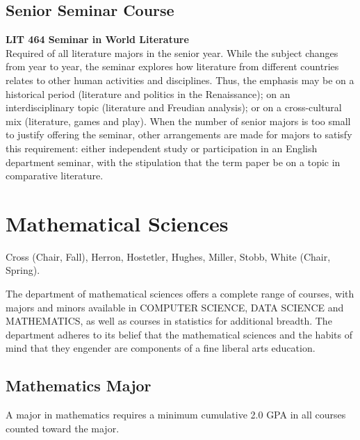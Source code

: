 \documentclass[
  letterpaper,
]{scrbook}
\begin{document}
\subsection{Senior Seminar Course}\label{senior-seminar-course}

\textbf{LIT 464 Seminar in World Literature}\\
Required of all literature majors in the senior year. While the subject
changes from year to year, the seminar explores how literature from
different countries relates to other human activities and disciplines.
Thus, the emphasis may be on a historical period (literature and
politics in the Renaissance); on an interdisciplinary topic (literature
and Freudian analysis); or on a cross-cultural mix (literature, games
and play). When the number of senior majors is too small to justify
offering the seminar, other arrangements are made for majors to satisfy
this requirement: either independent study or participation in an
English department seminar, with the stipulation that the term paper be
on a topic in comparative literature.

\section{Mathematical Sciences}\label{sec-mathematical-sciences}

Cross (Chair, Fall), Herron, Hostetler, Hughes, Miller, Stobb, White
(Chair, Spring).

The department of mathematical sciences offers a complete range of
courses, with majors and minors available in COMPUTER SCIENCE, DATA
SCIENCE and MATHEMATICS, as well as courses in statistics for additional
breadth. The department adheres to its belief that the mathematical
sciences and the habits of mind that they engender are components of a
fine liberal arts education.

\subsection{Mathematics Major}\label{mathematics-major}

A major in mathematics requires a minimum cumulative 2.0 GPA in all
courses counted toward the major.
\end{document}
